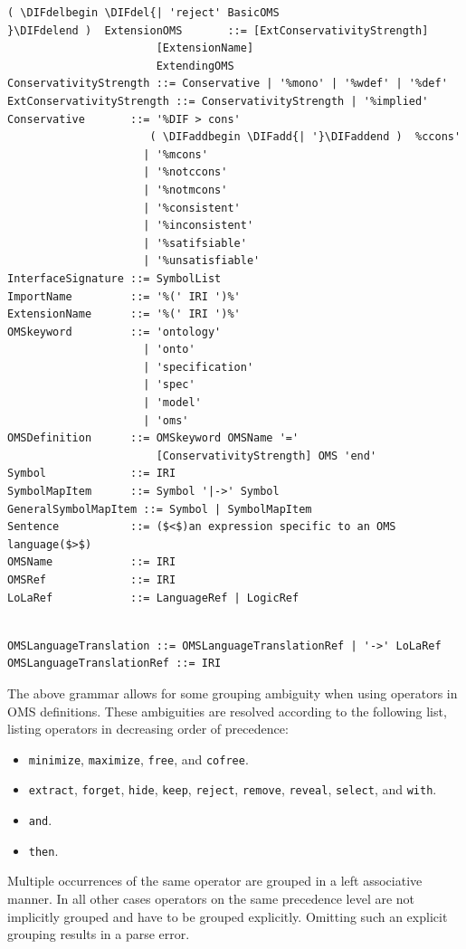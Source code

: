 \documentclass[10pt,fleqn,final]{scrreprt}
\newcommand*{\syntax}[1]{\texttt{#1}}
\providecommand{\DIFadd}[1]{{\protect\color{blue}\uwave{#1}}} %
\providecommand{\DIFdel}[1]{{\protect\color{red}\sout{#1}}}                      %
\providecommand{\DIFaddbegin}{} %
\providecommand{\DIFaddend}{} %
\providecommand{\DIFdelbegin}{} %
\providecommand{\DIFdelend}{} %
\begin{document}
\begin{lstlisting}[language=ebnf,escapeinside={()},mathescape]
 ( \DIFdelbegin \DIFdel{| 'reject' BasicOMS
}\DIFdelend )  ExtensionOMS       ::= [ExtConservativityStrength]
                       [ExtensionName]
                       ExtendingOMS
ConservativityStrength ::= Conservative | '%mono' | '%wdef' | '%def'
ExtConservativityStrength ::= ConservativityStrength | '%implied'
Conservative       ::= '%DIF > cons'
                      ( \DIFaddbegin \DIFadd{| '}\DIFaddend )  %ccons'
                     | '%mcons'
                     | '%notccons'
                     | '%notmcons'
                     | '%consistent'
                     | '%inconsistent'
                     | '%satifsiable'
                     | '%unsatisfiable'
InterfaceSignature ::= SymbolList
ImportName         ::= '%(' IRI ')%'
ExtensionName      ::= '%(' IRI ')%'
OMSkeyword         ::= 'ontology'
                     | 'onto'
                     | 'specification'
                     | 'spec'
                     | 'model'
                     | 'oms'
OMSDefinition      ::= OMSkeyword OMSName '='
                       [ConservativityStrength] OMS 'end'
Symbol             ::= IRI
SymbolMapItem      ::= Symbol '|->' Symbol
GeneralSymbolMapItem ::= Symbol | SymbolMapItem
Sentence           ::= ($<$)an expression specific to an OMS language($>$) 
OMSName            ::= IRI
OMSRef             ::= IRI
LoLaRef            ::= LanguageRef | LogicRef
\end{lstlisting}


\begin{lstlisting}[language=ebnf,mathescape]

OMSLanguageTranslation ::= OMSLanguageTranslationRef | '->' LoLaRef
OMSLanguageTranslationRef ::= IRI
\end{lstlisting}



The above grammar allows for some grouping ambiguity when using operators in
OMS definitions. These ambiguities are resolved according to the following
list, listing operators in decreasing order of precedence:
\begin{itemize}
  \item \syntax{minimize}, \syntax{maximize}, \syntax{free}, and \syntax{cofree}. 
  \item \syntax{extract}, \syntax{forget}, \syntax{hide}, \syntax{keep},
    \syntax{reject}, \syntax{remove}, \syntax{reveal}, \syntax{select}, and
    \syntax{with}.
  \item \syntax{and}.
  \item \syntax{then}.
\end{itemize}
Multiple occurrences of the same operator are grouped in a left associative
manner. In all other cases operators on the same precedence level are not
implicitly grouped and have to be grouped explicitly. Omitting such an explicit
grouping results in a parse error.
\end{document}
